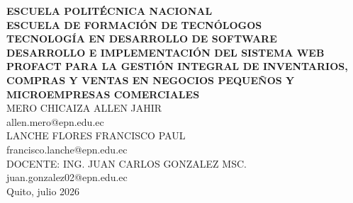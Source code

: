 \documentclass[12pt, letterpaper]{report}
\begin{document}


\begin{titlepage}
\begin{center}
    \vspace*{1cm}

    \begin{figure}[H]
    \centering
    \end{figure}

    \vspace{0.5cm}
    {\Large \textbf{ESCUELA POLITÉCNICA NACIONAL}} \\[0.3cm]
    {\large \textbf{ESCUELA DE FORMACIÓN DE TECNÓLOGOS}} \\[0.3cm]
    {\large \textbf{TECNOLOGÍA EN DESARROLLO DE SOFTWARE}} \\[1.5cm]

    {\large \textbf{DESARROLLO E IMPLEMENTACIÓN DEL SISTEMA WEB PROFACT PARA LA GESTIÓN INTEGRAL DE INVENTARIOS, COMPRAS Y VENTAS EN NEGOCIOS PEQUEÑOS Y MICROEMPRESAS COMERCIALES}} \\[1.5cm]

    MERO CHICAIZA ALLEN JAHIR \\
    allen.mero@epn.edu.ec \\[0.5cm]

    LANCHE FLORES FRANCISCO PAUL \\
    francisco.lanche@epn.edu.ec \\[1.5cm]

    DOCENTE: ING. JUAN CARLOS GONZALEZ MSC. \\
    juan.gonzalez02@epn.edu.ec \\[1.5cm]

    Quito, julio 2026

\end{center}
\end{titlepage}


\setcounter{page}{1}

\tableofcontents
\newpage
\end{document}
